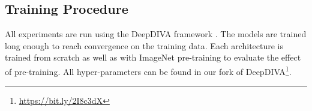 \documentclass[journal]{IEEEtran}
\newcommand{\ls}[1]{{\color{black}#1}}
\begin{document}
\begin{comment}
\begin{table}[t!]
    \caption{Overview of all the architectures used in this paper. VGG19, Inception V3, ResNet152 and DenseNet121 have been used for the classification and image-based content retrieval task. These networks expect a certain input size. FC-Densent57 (Tiramisu), SegNet and DeepLabV3 are architectures used for segmentation. These architectures can take various input sizes, we sampled random crops of size 256 from the input images.}
    \label{tab:architectures_overview}
    \vskip 0.15in
    \begin{center}
    \begin{small}
    \begin{sc}
    \begin{tabular}{l rc c }
    \toprule
        & \# parameters && input size \\
        \cmidrule{2-2} \cmidrule{4-4}
        VGG19 BN \cite{simonyan2014very} &  &&  \\
        Inception V3 \cite{Szegedy_2015_CVPR} &  &&  \\
        ResNet152 \cite{DBLP:journals/corr/HeZRS15} &  &&  \\
        DenseNet121 \cite{DBLP:journals/corr/HuangLW16a} &  &&  \\
        FC-Densenet57 \cite{jegou2017one} &  &&  \\
        UNet \cite{ronneberger2015u} &  &&  \\
    \bottomrule
    \end{tabular}
    \end{sc}
    \end{small}
    \end{center}
    \vskip -0.1in
\end{table}
\end{comment}

\subsection{Training Procedure}
\label{exp:training}


All experiments are run using the DeepDIVA framework \cite{alberti2018deepdiva}. \ls{The models are trained long enough to reach convergence on the training data.}
Each architecture is trained from scratch as well as with ImageNet \cite{imagenet_cvpr09} pre-training to evaluate the effect of pre-training.
All hyper-parameters can be found in our fork of DeepDIVA\footnote{\url{https://bit.ly/2I8c3dX}}.
\end{document}
